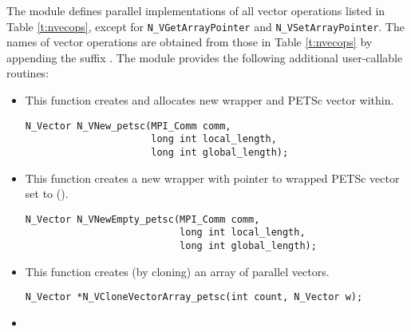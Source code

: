 The {\nvecpetsc} module defines parallel implementations of all vector operations listed 
in Table \ref{t:nvecops}, except for \verb|N_VGetArrayPointer| and 
\verb|N_VSetArrayPointer|. The names of vector operations are obtained from those in 
Table \ref{t:nvecops} by appending the suffix . The module {\nvecpetsc} 
provides the following additional user-callable routines:
\begin{itemize}


\item  {}
  
  This function creates and allocates new {\nvector} wrapper and PETSc 
  vector within.
 
  

\begin{verbatim}
N_Vector N_VNew_petsc(MPI_Comm comm, 
                      long int local_length, 
                      long int global_length);
\end{verbatim}
  

\item {}
 
  This function creates a new {\nvector} wrapper with pointer to wrapped 
  PETSc vector set to ().
 
  

\begin{verbatim}
N_Vector N_VNewEmpty_petsc(MPI_Comm comm, 
                           long int local_length, 
                           long int global_length);
\end{verbatim}

  


\item {}
 
  This function creates (by cloning) an array of  parallel vectors.
 
\begin{verbatim}
N_Vector *N_VCloneVectorArray_petsc(int count, N_Vector w);
\end{verbatim}


\item {}
 

\end{itemize}
